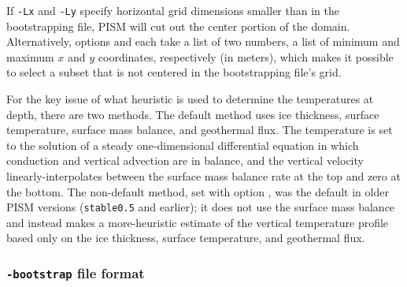If \texttt{-Lx} and \texttt{-Ly} specify horizontal grid dimensions smaller than in the bootstrapping file, PISM will cut out the center portion of the domain.  Alternatively, options  and  each take a list of two numbers, a list of minimum and maximum $x$ and $y$ coordinates, respectively (in meters), which makes it possible to select a subset that is not centered in the bootstrapping file's grid.

For the key issue of what heuristic is used to determine the temperatures at depth, there are two methods.  The default method uses ice thickness, surface temperature, surface mass balance, and geothermal flux.  The temperature is set to the solution of a steady one-dimensional differential equation in which conduction and vertical advection are in balance, and the vertical velocity linearly-interpolates between the surface mass balance rate at the top and zero at the bottom.  The non-default method, set with option , was the default in older PISM versions (\texttt{stable0.5} and earlier); it does not use the surface mass balance and instead makes a more-heuristic estimate of the vertical temperature profile based only on the ice thickness, surface temperature, and geothermal flux.

\subsubsection*{\texttt{-bootstrap} file format}
\label{sec:bootstrapping-format}

